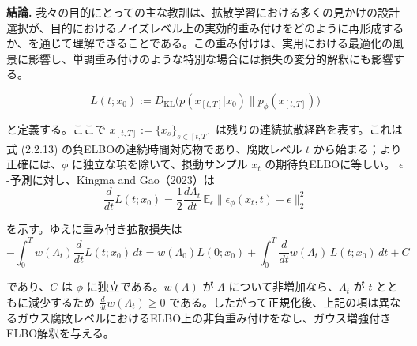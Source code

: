 \textbf{結論.} 我々の目的にとっての主な教訓は、拡散学習における多くの見かけの設計選択が、目的におけるノイズレベル上の実効的重み付けをどのように再形成するか、を通じて理解できることである。この重み付けは、実用における最適化の風景に影響し、単調重み付けのような特別な場合には損失の変分的解釈にも影響する。

\[
L(t; x_0) := D_{\mathrm{KL}}\bigl(p(x_{[t,T]}|x_0)\big\|p_\phi(x_{[t,T]})\bigr)
\]

と定義する。ここで $x_{[t,T]} := \{x_s\}_{s\in[t,T]}$ は残りの連続拡散経路を表す。これは式 (2.2.13) の負ELBOの連続時間対応物であり、腐敗レベル $t$ から始まる；より正確には、$\phi$ に独立な項を除いて、摂動サンプル $x_t$ の期待負ELBOに等しい。
$\epsilon$-予測に対し、Kingma and Gao（2023）は
\[
\frac{d}{dt}L(t; x_0) = \frac{1}{2}\frac{d\Lambda_t}{dt}\,\mathbb{E}_\epsilon\|\epsilon_\phi(x_t, t) - \epsilon\|_2^2
\]

を示す。ゆえに重み付き拡散損失は
\[
-\int_0^T w(\Lambda_t)\frac{d}{dt}L(t; x_0)\, dt = w(\Lambda_0)L(0; x_0) + \int_0^T \frac{d}{dt}w(\Lambda_t)\, L(t; x_0)\, dt + C
\]

であり、$C$ は $\phi$ に独立である。$w(\Lambda)$ が $\Lambda$ について非増加なら、$\Lambda_t$ が $t$ とともに減少するため $\frac{d}{dt}w(\Lambda_t) \ge 0$ である。したがって正規化後、上記の項は異なるガウス腐敗レベルにおけるELBO上の非負重み付けをなし、ガウス増強付きELBO解釈を与える。

